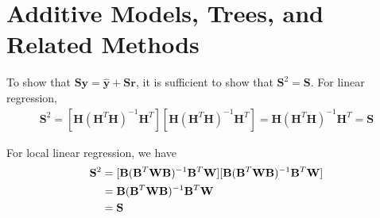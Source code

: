 \chapter{Additive Models, Trees, and Related Methods}
\label{ch:9}

\begin{exercise}
  To show that $\mathbf{Sy} = \hat{\mathbf{y}} + \mathbf{Sr} $, it is sufficient
  to show that $\mathbf{S}^2=\mathbf{S}$. For linear regression,
  \begin{align}
    \mathbf{S}^2=[\mathbf{H}(\mathbf{H}^T\mathbf{H})^{-1}\mathbf{H}^T]
    [\mathbf{H}(\mathbf{H}^T\mathbf{H})^{-1}\mathbf{H}^T] 
    =\mathbf{H}(\mathbf{H}^T\mathbf{H})^{-1}\mathbf{H}^T = \mathbf{S}
  \end{align}
  
  For local linear regression, we have
  \begin{align}
    \mathbf{S}^2 & =
    [\mathbf{B}(\mathbf{B}^T\mathbf{W}\mathbf{B})^{-1}\mathbf{B}^T\mathbf{W}] 
    [\mathbf{B}(\mathbf{B}^T\mathbf{W}\mathbf{B})^{-1}\mathbf{B}^T\mathbf{W}]
    \notag\\ &=
    \mathbf{B}(\mathbf{B}^T\mathbf{W}\mathbf{B})^{-1}\mathbf{B}^T\mathbf{W}
    \notag \\ &=
    \mathbf{S} 
  \end{align}
\end{exercise}

